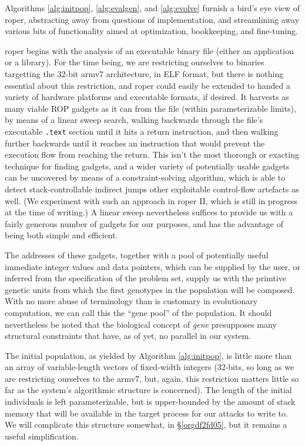 \documentclass[12pt,glossary]{dalthesis}
\begin{document}
Algorithms \ref{alg:initpop}, \ref{alg:evalgen}, and \ref{alg:evolve}
furnish a bird's eye view of \gls{roper}, abstracting away from questions of
implementation, and streamlining away various bits of functionality
aimed at optimization, bookkeeping, and fine-tuning.

\gls{roper} begins with the analysis of an executable binary file (either an
application or a library). For the time being, we are restricting
ourselves to binaries targetting the 32-bit \gls{armv7} architecture, in ELF
format, but there is nothing essential about this restriction, and
\gls{roper} could easily be extended to handed a variety of hardware
platforms and executable formats, if desired. It harvests as many viable
ROP gadgets as it can from the file (within parameterizable limits), by 
means of a linear sweep search, walking backwards through the file's
executable \texttt{.text} section until it hits a return instruction, and then
walking further backwards until it reaches an instruction that would
prevent the execution flow from reaching the return. This isn't the
most thorough or exacting technique for finding gadgets, and a wider
variety of potentially usable gadgets can be uncovered by means of
a constraint-solving algorithm, which is able to detect stack-controllable
indirect jumps other exploitable control-flow artefacts as well. (We experiment
with such an approach in \gls{roper} II, which is still in progress at the time of
writing.) A linear sweep nevertheless suffices to provide us with a fairly
generous number of gadgets for our purposes, and has the advantage of being
both simple and efficient.

The addresses of these gadgets, together with a pool of potentially useful
immediate integer values and data pointers, which can be supplied by the
user, or inferred from the specification of the problem set, supply us with
the primtive genetic units from which the first genotypes in the population will
be composed. With no more abuse of terminology than is customary in evolutionary
computation, we can call this the ``gene pool'' of the population. It should
nevertheless be noted that the biological concept of \emph{gene} presupposes many
structural constraints that have, as of yet, no parallel in our system.

The initial population, as yielded by Algorithm \ref{alg:initpop}, is
little more than an array of variable-length vectors of fixed-width
integers (32-bits, so long as we are restricting ourselves to the
\gls{armv7}, but, again, this restriction matters little so far as the
system's algorithmic structure is concerned). The length of the
initial individuals is left parameterizable, but is upper-bounded by
the amount of stack memory that will be available in the target
process for our attacks to write to. We will complicate this structure
somewhat, in \S \ref{orgdf2fd05}, but it remains a useful
simplification.
\end{document}
